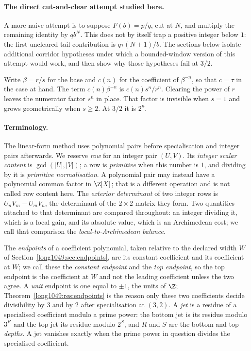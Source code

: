 \paragraph{The direct cut-and-clear attempt studied here.}
A more naive attempt is to suppose $F(b)=p/q$, cut at $N$, and multiply the
remaining identity by $qb^N$.  This does not by itself trap a positive integer
below $1$: the first uncleared tail contribution is
$q\tau(N+1)/b$.  The sections below isolate additional corridor hypotheses
under which a bounded-window version of this attempt would work, and then show
why those hypotheses fail at $3/2$.

Write $\beta=r/s$ for the base and $c(n)$ for the coefficient of $\beta^{-n}$,
so that $c=\tau$ in the case at hand.  The term $c(n)\beta^{-n}$ is
$c(n)s^{n}/r^{n}$.  Clearing the
power of $r$ leaves the numerator factor $s^{n}$ in place.  That factor is
invisible when $s=1$ and grows geometrically when $s\ge2$.  At $3/2$ it is
$2^{n}$.

\paragraph{Terminology.}
The linear-form method uses polynomial pairs before specialisation and integer
pairs afterwards.  We reserve \emph{row} for an integer pair $(U,V)$.  Its
\emph{integer scalar content} is $\gcd(|U|,|V|)$; a row is \emph{primitive}
when this number is $1$, and dividing by it is \emph{primitive normalisation}.
A polynomial pair may instead have a polynomial common factor in $\Z[X]$;
that is a different operation and is not called row content here.  The
\emph{exterior determinant} of two integer rows is
$U_{n}V_{m}-U_{m}V_{n}$, the determinant of the $2\times2$ matrix they form.
Two quantities attached to that determinant are compared throughout: an
integer dividing it, which is a local gain, and its absolute value, which is an
Archimedean cost; we call that comparison the \emph{local-to-Archimedean
balance}.

The \emph{endpoints} of a coefficient polynomial, taken relative to
the declared width $W$ of Section~\ref{long1049:sec:endpoints}, are its constant
coefficient and its coefficient at $W$; we call these the \emph{constant
endpoint} and the \emph{top endpoint}, so the top endpoint is the coefficient
at $W$ and not the leading coefficient unless the two agree.  A \emph{unit}
endpoint is one equal
to $\pm1$, the units of $\Z$; Theorem~\ref{long1049:res:endpoints} is the reason only these
two coefficients decide divisibility by $3$ and by $2$ after specialisation at
$(3,2)$.  A \emph{jet} is a
residue of a specialised coefficient modulo a prime power: the bottom jet is
its residue modulo $3^{R}$ and the top jet its residue modulo $2^{S}$, and $R$
and $S$ are the bottom and top \emph{depths}.  A jet vanishes exactly when the
prime power in question divides the specialised coefficient.

